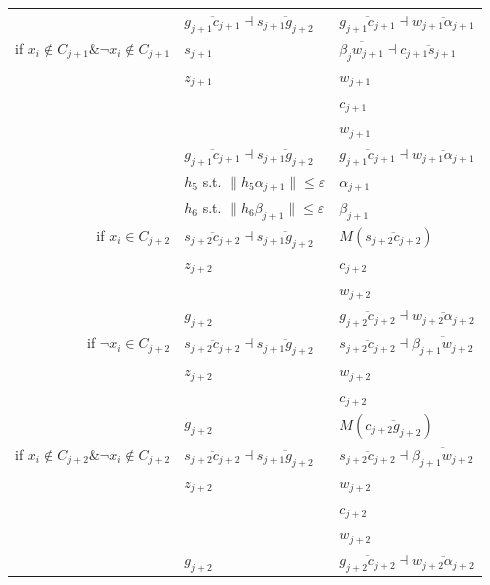 \documentclass[12pt]{dalthesis}
\def\favoritefont{\bfseries \sffamily}
\def\QED{\ensuremath{{\Box}}}
\def\markatright#1{\leavevmode\unskip\nobreak\quad\hspace*{\fill}{#1}}
\newenvironment{proof}
	{\begin{trivlist}\item[\hskip\labelsep{\favoritefont Proof:}]}
	{\markatright{\QED}\end{trivlist}}
\newcommand{\eps}{\varepsilon}
\newcommand{\Seg}[1]{{\overline{#1}}}
\begin{document}
\begin{proof}
\begin{table}[h]
\begin{tabular}{ r | l | l  }
 &  $\Seg{g_{j+1}c_{j+1}}	\dashv \Seg{s_{j+1}g_{j+2}}$ & $\Seg{g_{j+1}c_{j+1}}	\dashv \Seg{w_{j+1}\alpha_{j+1}}$ \\






if $x_i \notin C_{j+1} \& \neg x_i \notin C_{j+1}$ &  				 $s_{j+1}$  & $\Seg{\beta_jw_{j+1}}	\dashv \Seg{c_{j+1}s_{j+1}}$\\
& $z_{j+1}$ & $w_{j+1}$\\
 & & $c_{j+1}$ \\
 & & $w_{j+1}$ \\
&  $\Seg{g_{j+1}c_{j+1}}	\dashv \Seg{s_{j+1}g_{j+2}}$ & $\Seg{g_{j+1}c_{j+1}}	\dashv \Seg{w_{j+1}\alpha_{j+1}}$ \\


\hline

	&  $h_5$ s.t.  $\| h_5\alpha_{j+1} \| \le \eps$ & $\alpha_{j+1}$\\
	&  	$h_6$ s.t.  $\| h_6 \beta_{j+1} \| \le \eps$ & $\beta_{j+1}$\\
\hline




if $ x_i \in C_{j+2}$ &  		$\Seg{s_{j+2}c_{j+2}}	\dashv \Seg{s_{j+1}g_{j+2}}$ 		   & $M(\Seg{s_{j+2}c_{j+2}})$\\

 & $z_{j+2}$ & $c_{j+2}$ \\
 &  & $w_{j+2}$ \\


 &  $g_{j+2}$ & $\Seg{g_{j+2}c_{j+2}}	\dashv \Seg{w_{j+2}\alpha_{j+2}}$ \\






if $\neg x_i \in C_{j+2}$ &  				$\Seg{s_{j+2}c_{j+2}}	\dashv \Seg{s_{j+1}g_{j+2}}$ 		   &   $\Seg{s_{j+2}c_{j+2}}	\dashv \Seg{\beta_{j+1}w_{j+2}}$   \\
 & $z_{j+2}$ & $w_{j+2}$ \\
 &  & $c_{j+2}$ \\


 &   $g_{j+2}$ & $M(\Seg{c_{j+2}g_{j+2}})$ \\







if $x_i \notin C_{j+2} \& \neg x_i \notin C_{j+2}$ &  				
$\Seg{s_{j+2}c_{j+2}}	\dashv \Seg{s_{j+1}g_{j+2}}$ 		   &   $\Seg{s_{j+2}c_{j+2}}	\dashv \Seg{\beta_{j+1}w_{j+2}}$  \\
& $z_{j+2}$ & $w_{j+2}$\\
 & & $c_{j+2}$ \\
 & & $w_{j+2}$ \\
&  $g_{j+2}$ & $\Seg{g_{j+2}c_{j+2}}	\dashv \Seg{w_{j+2}\alpha_{j+2}}$ \\



\end{tabular}
\end{table}
\end{proof}
\end{document}
